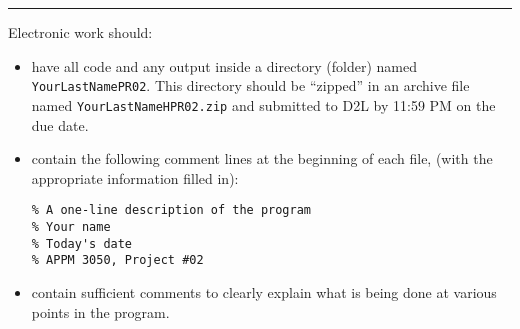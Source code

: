 \documentclass[11pt]{article}
\begin{document}
\hrule
\medskip
\noindent
Electronic work should:
\begin{itemize}

\item have all code and any output inside a directory
      (folder) named {\tt YourLastNamePR02}. This directory should be ``zipped'' 
      in an archive file named {\tt YourLastNameHPR02.zip} and submitted
      to D2L by 11:59 PM on the due date. 
\item contain the following comment lines at the beginning of each file,
      (with the appropriate information filled in):
{\footnotesize\tt\begin{verbatim}
% A one-line description of the program
% Your name
% Today's date
% APPM 3050, Project #02
\end{verbatim}}

\item contain sufficient comments to clearly explain what is being
      done at various points in the program.

\end{itemize}

\end{document}
